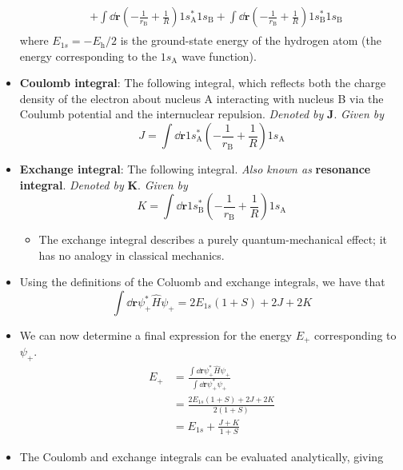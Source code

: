 \documentclass[../notes.tex]{subfiles}
\begin{document}
\begin{itemize}
\begin{align*}
\begin{split}
            & +\int\dd{\mathbf{r}}\left( -\frac{1}{r_\text{B}}+\frac{1}{R} \right)1s_\text{A}^*1s_\text{B}+\int\dd{\mathbf{r}}\left( -\frac{1}{r_\text{B}}+\frac{1}{R} \right)1s_\text{B}^*1s_\text{B}
        \end{split}
    \end{align*}
    where $E_{1s}=-E_\text{h}/2$ is the ground-state energy of the hydrogen atom (the energy corresponding to the $1s_\text{A}$ wave function).
    \item \textbf{Coulomb integral}: The following integral, which reflects both the charge density of the electron about nucleus A interacting with nucleus B via the Coulumb potential and the internuclear repulsion. \emph{Denoted by} $\bm{J}$. \emph{Given by}
    \begin{equation*}
        J = \int\dd{\mathbf{r}}1s_\text{A}^*\left( -\frac{1}{r_\text{B}}+\frac{1}{R} \right)1s_\text{A}
    \end{equation*}
    \item \textbf{Exchange integral}: The following integral. \emph{Also known as} \textbf{resonance integral}. \emph{Denoted by} $\bm{K}$. \emph{Given by}
    \begin{equation*}
        K = \int\dd{\mathbf{r}}1s_\text{B}^*\left( -\frac{1}{r_\text{B}}+\frac{1}{R} \right)1s_\text{A}
    \end{equation*}
    \begin{itemize}
        \item The exchange integral describes a purely quantum-mechanical effect; it has no analogy in classical mechanics.
    \end{itemize}
    \item Using the definitions of the Coluomb and exchange integrals, we have that
    \begin{equation*}
        \int\dd{\mathbf{r}}\psi_+^*\hat{H}\psi_+ = 2E_{1s}(1+S)+2J+2K
    \end{equation*}
    \item We can now determine a final expression for the energy $E_+$ corresponding to $\psi_+$.
    \begin{align*}
        E_+ &= \frac{\int\dd{\mathbf{r}}\psi_+^*\hat{H}\psi_+}{\int\dd{\mathbf{r}}\psi_+^*\psi_+}\\
        &= \frac{2E_{1s}(1+S)+2J+2K}{2(1+S)}\\
        &= E_{1s}+\frac{J+K}{1+S}
    \end{align*}
    \item The Coulomb and exchange integrals can be evaluated analytically, giving

\end{itemize}
\end{document}
